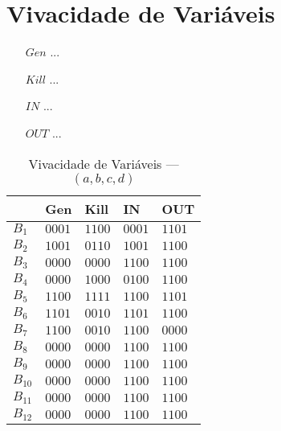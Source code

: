 \section{Vivacidade de Vari\'aveis}

\begin{itemize}
  \item[$Gen$] ...
  \item[$Kill$] ...
  \item[$IN$] ...
  \item[$OUT$] ...
\end{itemize}



\begin{table}[ht]
\centering
\begin{tabular}{l|l|l|l|l}
	& Gen & Kill & IN & OUT\\
\hline
$B_{1}$ &  $0001$ & $1100$ & $0001$ & $1101$\\
$B_{2}$ &  $1001$ & $0110$ & $1001$ & $1100$\\
$B_{3}$ &  $0000$ & $0000$ & $1100$ & $1100$\\
$B_{4}$ &  $0000$ & $1000$ & $0100$ & $1100$\\
$B_{5}$ &  $1100$ & $1111$ & $1100$ & $1101$\\
$B_{6}$ &  $1101$ & $0010$ & $1101$ & $1100$\\
$B_{7}$ &  $1100$ & $0010$ & $1100$ & $0000$\\
$B_{8}$ &  $0000$ & $0000$ & $1100$ & $1100$\\
$B_{9}$ &  $0000$ & $0000$ & $1100$ & $1100$\\
$B_{10}$ &  $0000$ & $0000$ & $1100$ & $1100$\\
$B_{11}$ &  $0000$ & $0000$ & $1100$ & $1100$\\
$B_{12}$ &  $0000$ & $0000$ & $1100$ & $1100$\\
\end{tabular}
\caption{Vivacidade de Vari\'aveis --- $(a, b, c, d)$}
\end{table}


